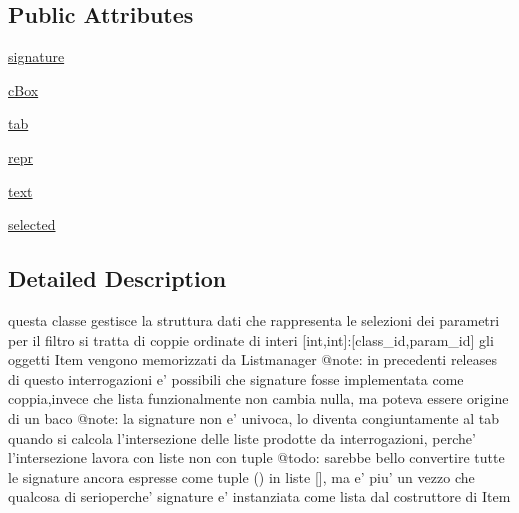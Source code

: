\subsection*{Public Attributes}
\begin{DoxyCompactItemize}
\item 
\hyperlink{classmmasgis_1_1interrogazioni_1_1Item_a36e9d3d8dd89b9ac2b5904452634b2c6}{signature}
\item 
\hyperlink{classmmasgis_1_1interrogazioni_1_1Item_ae820aa9ce4d0aa95e275033e8b4cc759}{cBox}
\item 
\hyperlink{classmmasgis_1_1interrogazioni_1_1Item_addc2f4e0e2a62bd5e79700b9698cb943}{tab}
\item 
\hyperlink{classmmasgis_1_1interrogazioni_1_1Item_a1613cc266f2449036ecf24ebe3eb4f6f}{repr}
\item 
\hyperlink{classmmasgis_1_1interrogazioni_1_1Item_adf112778684c85b5c4fa632714c31514}{text}
\item 
\hyperlink{classmmasgis_1_1interrogazioni_1_1Item_af66e0f09c194d7dca23b7585c5f7e16a}{selected}
\end{DoxyCompactItemize}


\subsection{Detailed Description}
\begin{DoxyVerb}
questa classe  gestisce la struttura dati che rappresenta le selezioni dei parametri per il filtro
si tratta di coppie ordinate di interi [int,int]:[class_id,param_id]
gli oggetti Item vengono memorizzati da Listmanager
@note: in precedenti releases di questo interrogazioni e' possibili che signature
 fosse implementata come coppia,invece che lista funzionalmente non cambia nulla,
  ma poteva essere origine di un baco
 @note: la signature  non e' univoca, lo diventa congiuntamente al tab
quando si calcola l'intersezione delle liste prodotte da interrogazioni, perche' l'intersezione lavora con liste non con tuple
@todo: sarebbe bello convertire tutte le signature ancora espresse come tuple () in liste [], ma e' piu' un vezzo che qualcosa di serioperche' signature e' instanziata come lista dal costruttore di Item 
        
\end{DoxyVerb}
 

